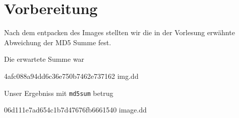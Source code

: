 \section{Vorbereitung}
Nach dem entpacken des Images stellten wir die in der Vorlesung erwähnte Abweichung der MD5 Summe fest.

Die erwartete Summe war
\begin{center}
4afc088a94dd6c36e750b7462e737162  img.dd
\end{center}
Unser Ergebniss mit \texttt{md5sum} betrug
\begin{center}
06d111e7ad654c1b7d47676fb6661540  image.dd
\end{center}

